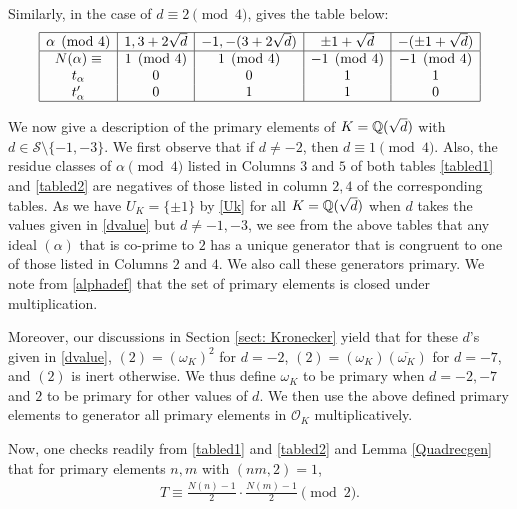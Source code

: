 \documentclass[twoside,leqno,10pt, A4]{amsart}
\begin{document}
   Similarly, in the case of $d \equiv 2 \pmod 4$, \cite{Lemmermeyer05} gives the table below:
\begin{align}
\label{tabled2}
   \begin{array}{|c|c|c|c|c|}
    \hline
    \alpha \pmod 4& 1, 3+2\sqrt{d} & -1, -(3+2\sqrt{d}) & \pm 1+\sqrt{d} & -(\pm 1+\sqrt{d}) \\ \hline
    N(\alpha) \equiv & 1 \pmod 4 & 1 \pmod 4 & -1 \pmod 4 & -1 \pmod 4 \\
    t_{\alpha} & 0 & 0 & 1 &1 \\
     t'_{\alpha} & 0 & 1 & 1 &0 \\
     \hline
   \end{array}
\end{align}

   We now give a description of the primary elements of $K=\mathbb Q(\sqrt{d})$ with $d \in \mathcal{S} \setminus \{ -1, -3 \}$.  We first observe that if $d \neq -2$, then $d \equiv 1 \pmod 4$.  Also, the residue classes of $\alpha \pmod 4$ listed in Columns $3$ and $5$ of both tables \eqref{tabled1} and \eqref{tabled2} are negatives of those listed in column $2,4$ of the corresponding tables. As we have $U_K=\{ \pm 1\}$  by \eqref{Uk} for all $K=\mathbb Q(\sqrt{d})$ when $d$ takes the values given in \eqref{dvalue} but $d \neq -1, -3$, we see from the above tables that any ideal $(\alpha)$ that is co-prime to $2$ has a unique generator that is congruent to one of those listed in Columns $2$ and $4$. We also call these generators primary.  We note from \eqref{alphadef} that the set of primary elements is closed under multiplication. \newline

  Moreover, our discussions in Section \ref{sect: Kronecker} yield that for these $d$'s given in \eqref{dvalue}, $(2)=(\omega_K)^2$ for $d=-2$, $(2)=(\omega_K)({\overline{\omega_K}})$ for $d =-7$, and $(2)$ is inert otherwise. We thus define $\omega_K$ to be primary when $d=-2, -7$ and $2$ to be primary for other values of $d$. We then use the above defined primary elements to generator all primary elements in $\mathcal O_K$ multiplicatively. \newline

   Now, one checks readily from \eqref{tabled1} and \eqref{tabled2} and Lemma \ref{Quadrecgen} that for primary elements $n, m$ with $(nm, 2)=1$,
\begin{align*}
   T \equiv  \frac {N(n)-1}{2}\cdot \frac {N(m)-1}{2} \pmod 2.
\end{align*}
\end{document}
